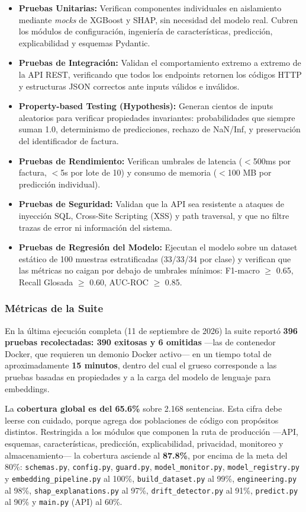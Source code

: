 \documentclass[12pt,letterpaper]{report}
\begin{document}
\begin{itemize}
    \item \textbf{Pruebas Unitarias:} Verifican componentes individuales en aislamiento mediante \textit{mocks} de XGBoost y SHAP, sin necesidad del modelo real. Cubren los módulos de configuración, ingeniería de características, predicción, explicabilidad y esquemas Pydantic.
    \item \textbf{Pruebas de Integración:} Validan el comportamiento extremo a extremo de la API REST, verificando que todos los endpoints retornen los códigos HTTP y estructuras JSON correctos ante inputs válidos e inválidos.
    \item \textbf{Property-based Testing (Hypothesis):} Generan cientos de inputs aleatorios para verificar propiedades invariantes: probabilidades que siempre suman 1.0, determinismo de predicciones, rechazo de NaN/Inf, y preservación del identificador de factura.
    \item \textbf{Pruebas de Rendimiento:} Verifican umbrales de latencia ($<$500ms por factura, $<$5s por lote de 10) y consumo de memoria ($<$100 MB por predicción individual).
    \item \textbf{Pruebas de Seguridad:} Validan que la API sea resistente a ataques de inyección SQL, Cross-Site Scripting (XSS) y path traversal, y que no filtre trazas de error ni información del sistema.
    \item \textbf{Pruebas de Regresión del Modelo:} Ejecutan el modelo sobre un dataset estático de 100 muestras estratificadas (33/33/34 por clase) y verifican que las métricas no caigan por debajo de umbrales mínimos: F1-macro $\geq$ 0.65, Recall Glosada $\geq$ 0.60, AUC-ROC $\geq$ 0.85.
\end{itemize}

\subsubsection{Métricas de la Suite}

En la última ejecución completa (11 de septiembre de 2026) la suite reportó
\textbf{396 pruebas recolectadas: 390 exitosas y 6 omitidas} —las de contenedor Docker,
que requieren un demonio Docker activo— en un tiempo total de aproximadamente
\textbf{15 minutos}, dentro del cual el grueso corresponde a las pruebas basadas en
propiedades y a la carga del modelo de lenguaje para embeddings.

La \textbf{cobertura global es del 65.6\%} sobre 2.168 sentencias. Esta cifra debe
leerse con cuidado, porque agrega dos poblaciones de código con propósitos distintos.
Restringida a los módulos que componen la ruta de producción —API, esquemas,
características, predicción, explicabilidad, privacidad, monitoreo y almacenamiento— la
cobertura asciende al \textbf{87.8\%}, por encima de la meta del 80\%: \texttt{schemas.py},
\texttt{config.py}, \texttt{guard.py}, \texttt{model\_monitor.py},
\texttt{model\_registry.py} y \texttt{embedding\_pipeline.py} al 100\%,
\texttt{build\_dataset.py} al 99\%, \texttt{engineering.py} al 98\%,
\texttt{shap\_explanations.py} al 97\%, \texttt{drift\_detector.py} al 91\%,
\texttt{predict.py} al 90\% y \texttt{main.py} (API) al 60\%.
\end{document}
